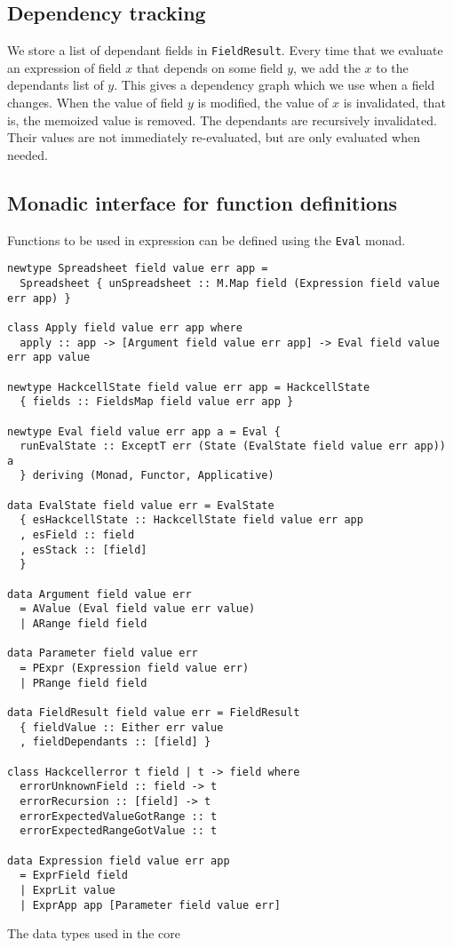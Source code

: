 \documentclass{article}
\begin{document}
	\subsection{Dependency tracking}
	We store a list of dependant fields in \texttt{FieldResult}. Every time that we evaluate an expression of field $x$ that depends on some field $y$, we add the $x$ to the dependants list of $y$. This gives a dependency graph which we use when a field changes. When the value of field $y$ is modified, the value of $x$ is invalidated, that is, the memoized value is removed. The dependants are recursively invalidated. Their values are not immediately re-evaluated, but are only evaluated when needed.
	
	\subsection{Monadic interface for function definitions}
	Functions to be used in expression can be defined using the \texttt{Eval} monad.
	
	
	\begin{listing}
		\begin{verbatim}
newtype Spreadsheet field value err app =
  Spreadsheet { unSpreadsheet :: M.Map field (Expression field value err app) }

class Apply field value err app where
  apply :: app -> [Argument field value err app] -> Eval field value err app value

newtype HackcellState field value err app = HackcellState
  { fields :: FieldsMap field value err app }

newtype Eval field value err app a = Eval {
  runEvalState :: ExceptT err (State (EvalState field value err app)) a
  } deriving (Monad, Functor, Applicative)

data EvalState field value err = EvalState
  { esHackcellState :: HackcellState field value err app
  , esField :: field
  , esStack :: [field]
  }

data Argument field value err
  = AValue (Eval field value err value)
  | ARange field field

data Parameter field value err
  = PExpr (Expression field value err)
  | PRange field field

data FieldResult field value err = FieldResult
  { fieldValue :: Either err value
  , fieldDependants :: [field] }

class Hackcellerror t field | t -> field where
  errorUnknownField :: field -> t
  errorRecursion :: [field] -> t
  errorExpectedValueGotRange :: t
  errorExpectedRangeGotValue :: t

data Expression field value err app
  = ExprField field
  | ExprLit value
  | ExprApp app [Parameter field value err]
		\end{verbatim}
		\caption{The data types used in the core}
		\label{listing:datatypes}
	\end{listing}
	
\end{document}
